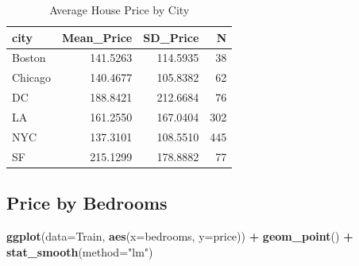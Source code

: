 \documentclass[]{book}
\newenvironment{Shaded}{\begin{snugshade}}{\end{snugshade}}
\newcommand{\KeywordTok}[1]{\textcolor[rgb]{0.13,0.29,0.53}{\textbf{#1}}}
\newcommand{\DataTypeTok}[1]{\textcolor[rgb]{0.13,0.29,0.53}{#1}}
\newcommand{\StringTok}[1]{\textcolor[rgb]{0.31,0.60,0.02}{#1}}
\newcommand{\OperatorTok}[1]{\textcolor[rgb]{0.81,0.36,0.00}{\textbf{#1}}}
\newcommand{\NormalTok}[1]{#1}
\begin{document}
\begin{Shaded}
\end{Shaded}

\begin{table}

\caption{\label{tab:unnamed-chunk-670}Average House Price by City}
\centering
\begin{tabular}[t]{l|r|r|r}
\hline
city & Mean\_Price & SD\_Price & N\\
\hline
Boston & 141.5263 & 114.5935 & 38\\
\hline
Chicago & 140.4677 & 105.8382 & 62\\
\hline
DC & 188.8421 & 212.6684 & 76\\
\hline
LA & 161.2550 & 167.0404 & 302\\
\hline
NYC & 137.3101 & 108.5510 & 445\\
\hline
SF & 215.1299 & 178.8882 & 77\\
\hline
\end{tabular}
\end{table}

\subsection{Price by Bedrooms}\label{price-by-bedrooms}

\begin{Shaded}
\begin{Highlighting}[]
\KeywordTok{ggplot}\NormalTok{(}\DataTypeTok{data=}\NormalTok{Train, }\KeywordTok{aes}\NormalTok{(}\DataTypeTok{x=}\NormalTok{bedrooms, }\DataTypeTok{y=}\NormalTok{price)) }\OperatorTok{+}\StringTok{ }\KeywordTok{geom_point}\NormalTok{() }\OperatorTok{+}\StringTok{ }\KeywordTok{stat_smooth}\NormalTok{(}\DataTypeTok{method=}\StringTok{"lm"}\NormalTok{)}
\end{Highlighting}
\end{Shaded}
\end{document}
